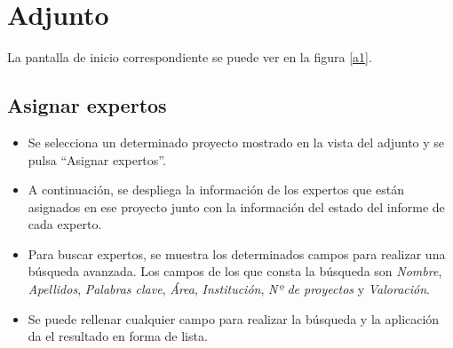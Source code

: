 \documentclass[11pt,a4paper,spanish,twoside]{book}
\begin{document}
\section{Adjunto}
La pantalla de inicio correspondiente se puede ver en la figura \ref{a1}.

\subsection{Asignar expertos}
\begin{itemize}
\item Se selecciona un determinado proyecto mostrado en la vista del adjunto y
  se pulsa ``Asignar expertos''.
\item A continuación, se despliega la información de los expertos que están
  asignados en ese proyecto junto con la información del estado del informe de
  cada experto.
\item Para buscar expertos, se muestra los determinados campos para realizar una
  búsqueda avanzada. Los campos de los que consta la búsqueda son
  \emph{Nombre}, \emph{Apellidos}, \emph{Palabras clave}, \emph{Área},
  \emph{Institución}, \emph{Nº de proyectos} y \emph{Valoración}.
\item Se puede rellenar cualquier campo para realizar la búsqueda y la
  aplicación da el resultado en forma de lista.
\end{itemize}
\end{document}
